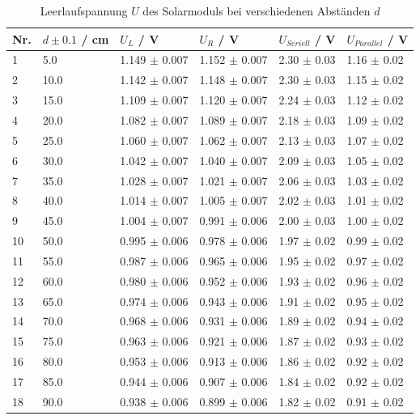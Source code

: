 \documentclass[12pt,a4paper,twoside]{article}
\begin{document}
\begin{table}[H]
    \centering
    \caption{Leerlaufspannung $U$ des Solarmoduls bei verschiedenen Abständen $d$}
    \label{tab:Messdaten Spannung Solar}
    \begin{tabular}{| l | l | l | l | l | l |}
        \hline
        Nr. & $d \pm 0.1 $ / cm & $U_{L}$ / V & $U_{R}$ / V & $U_{Seriell}$ / V & $U_{Parallel}$ / V \\
        \hline
        1  & 5.0  & 1.149 $\pm$ 0.007 & 1.152 $\pm$ 0.007 & 2.30 $\pm$ 0.03 & 1.16 $\pm$ 0.02   \\
        2  & 10.0 & 1.142 $\pm$ 0.007 & 1.148 $\pm$ 0.007 & 2.30 $\pm$ 0.03 & 1.15 $\pm$ 0.02   \\
        3  & 15.0 & 1.109 $\pm$ 0.007 & 1.120 $\pm$ 0.007 & 2.24 $\pm$ 0.03 & 1.12 $\pm$ 0.02   \\
        4  & 20.0 & 1.082 $\pm$ 0.007 & 1.089 $\pm$ 0.007 & 2.18 $\pm$ 0.03 & 1.09 $\pm$ 0.02   \\
        5  & 25.0 & 1.060 $\pm$ 0.007 & 1.062 $\pm$ 0.007 & 2.13 $\pm$ 0.03 & 1.07 $\pm$ 0.02   \\
        6  & 30.0 & 1.042 $\pm$ 0.007 & 1.040 $\pm$ 0.007 & 2.09 $\pm$ 0.03 & 1.05 $\pm$ 0.02   \\
        7  & 35.0 & 1.028 $\pm$ 0.007 & 1.021 $\pm$ 0.007 & 2.06 $\pm$ 0.03 & 1.03 $\pm$ 0.02   \\
        8  & 40.0 & 1.014 $\pm$ 0.007 & 1.005 $\pm$ 0.007 & 2.02 $\pm$ 0.03 & 1.01 $\pm$ 0.02   \\
        9  & 45.0 & 1.004 $\pm$ 0.007 & 0.991 $\pm$ 0.006 & 2.00 $\pm$ 0.03 & 1.00 $\pm$ 0.02   \\
        10 & 50.0 & 0.995 $\pm$ 0.006 & 0.978 $\pm$ 0.006 & 1.97 $\pm$ 0.02 & 0.99 $\pm$ 0.02   \\
        11 & 55.0 & 0.987 $\pm$ 0.006 & 0.965 $\pm$ 0.006 & 1.95 $\pm$ 0.02 & 0.97 $\pm$ 0.02   \\
        12 & 60.0 & 0.980 $\pm$ 0.006 & 0.952 $\pm$ 0.006 & 1.93 $\pm$ 0.02 & 0.96 $\pm$ 0.02   \\
        13 & 65.0 & 0.974 $\pm$ 0.006 & 0.943 $\pm$ 0.006 & 1.91 $\pm$ 0.02 & 0.95 $\pm$ 0.02   \\
        14 & 70.0 & 0.968 $\pm$ 0.006 & 0.931 $\pm$ 0.006 & 1.89 $\pm$ 0.02 & 0.94 $\pm$ 0.02   \\
        15 & 75.0 & 0.963 $\pm$ 0.006 & 0.921 $\pm$ 0.006 & 1.87 $\pm$ 0.02 & 0.93 $\pm$ 0.02   \\
        16 & 80.0 & 0.953 $\pm$ 0.006 & 0.913 $\pm$ 0.006 & 1.86 $\pm$ 0.02 & 0.92 $\pm$ 0.02   \\
        17 & 85.0 & 0.944 $\pm$ 0.006 & 0.907 $\pm$ 0.006 & 1.84 $\pm$ 0.02 & 0.92 $\pm$ 0.02   \\
        18 & 90.0 & 0.938 $\pm$ 0.006 & 0.899 $\pm$ 0.006 & 1.82 $\pm$ 0.02 & 0.91 $\pm$ 0.02   \\
        \hline
    \end{tabular}
\end{table}
\end{document}
